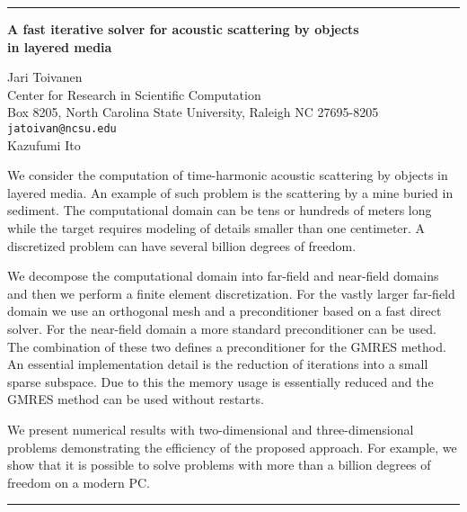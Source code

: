\documentclass[twosided]{report}
\begin{document}
	\begin{center} \rule{6in}{1pt} \end{center}

\begin{center}
{\large			%
{\bf A fast iterative solver for acoustic scattering by objects \\
	in layered media}}

	Jari Toivanen \\
	Center for Research in Scientific Computation \\
	Box 8205, North Carolina State University, Raleigh NC 27695-8205 \\
	{\tt jatoivan@ncsu.edu} \\
	Kazufumi Ito
\end{center}
We consider the computation of time-harmonic acoustic
scattering by objects in layered media. An example of such
problem is the scattering by a mine buried in sediment. The
computational domain can be tens or hundreds of meters long
while the target requires modeling of details smaller than
one centimeter. A discretized problem can have several
billion degrees of freedom.

We decompose the
computational domain into far-field and near-field domains
and then we perform a finite element discretization. For the
vastly larger far-field domain we use an orthogonal mesh and
a preconditioner based on a fast direct solver. For the
near-field domain a more standard preconditioner can be
used. The combination of these two defines a preconditioner
for the GMRES method. An essential implementation detail is
the reduction of iterations into a small sparse subspace.
Due to this the memory usage is essentially reduced and the
GMRES method can be used without restarts.

We present
numerical results with two-dimensional and three-dimensional
problems demonstrating the efficiency of the proposed
approach. For example, we show that it is possible to solve
problems with more than a billion degrees of freedom on a
modern PC.



	\begin{center} \rule{6in}{1pt} \end{center}
\end{document}
